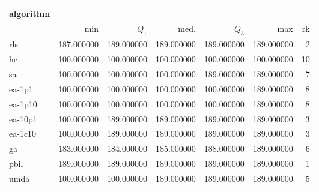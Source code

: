 \begin{tabular}{@{}l*{5}{>{{}}N{3}{0}}>{{}}N{2}{0}@{}}
\toprule
{algorithm} &  \\
\midrule
& {min} & {$Q_1$} & {med.} & {$Q_3$} & {max} & {rk}\\
\midrule
rls & 187.000000 & {\color{blue}} 189.000000 & {\color{blue}} 189.000000 & {\color{blue}} 189.000000 & {\color{blue}} 189.000000 & 2\\
hc & 100.000000 & 100.000000 & 100.000000 & 100.000000 & 100.000000 & 10\\
sa & 100.000000 & 100.000000 & 100.000000 & {\color{blue}} 189.000000 & {\color{blue}} 189.000000 & 7\\
ea-1p1 & 100.000000 & 100.000000 & 100.000000 & 100.000000 & {\color{blue}} 189.000000 & 8\\
ea-1p10 & 100.000000 & 100.000000 & 100.000000 & 100.000000 & {\color{blue}} 189.000000 & 8\\
ea-10p1 & 100.000000 & {\color{blue}} 189.000000 & {\color{blue}} 189.000000 & {\color{blue}} 189.000000 & {\color{blue}} 189.000000 & 3\\
ea-1c10 & 100.000000 & {\color{blue}} 189.000000 & {\color{blue}} 189.000000 & {\color{blue}} 189.000000 & {\color{blue}} 189.000000 & 3\\
ga & 183.000000 & 184.000000 & 185.000000 & 188.000000 & {\color{blue}} 189.000000 & 6\\
pbil & {\color{blue}} 189.000000 & {\color{blue}} 189.000000 & {\color{blue}} 189.000000 & {\color{blue}} 189.000000 & {\color{blue}} 189.000000 & 1\\
umda & 100.000000 & 100.000000 & {\color{blue}} 189.000000 & {\color{blue}} 189.000000 & {\color{blue}} 189.000000 & 5\\
\bottomrule
\end{tabular}
